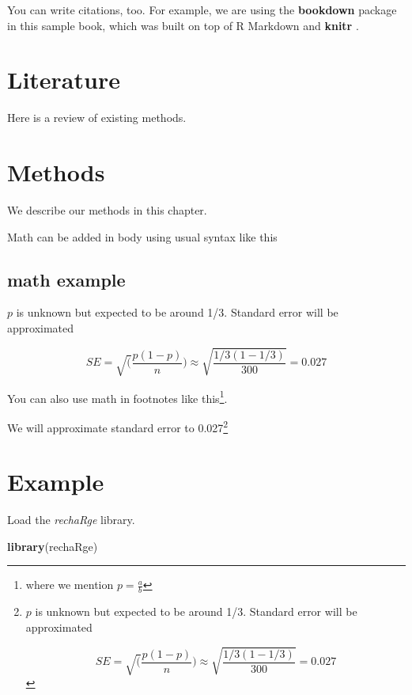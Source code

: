 \documentclass[
]{book}
\newenvironment{Shaded}{\begin{snugshade}}{\end{snugshade}}
\newcommand{\FunctionTok}[1]{\textcolor[rgb]{0.13,0.29,0.53}{\textbf{#1}}}
\newcommand{\NormalTok}[1]{#1}
\begin{document}
You can write citations, too. For example, we are using the \textbf{bookdown} package \citep{R-bookdown} in this sample book, which was built on top of R Markdown and \textbf{knitr} \citep{xie2015}.

\hypertarget{literature}{%
\chapter{Literature}\label{literature}}

Here is a review of existing methods.

\hypertarget{methods}{%
\chapter{Methods}\label{methods}}

We describe our methods in this chapter.

Math can be added in body using usual syntax like this

\hypertarget{math-example}{%
\section{math example}\label{math-example}}

\(p\) is unknown but expected to be around 1/3. Standard error will be approximated

\[
SE = \sqrt(\frac{p(1-p)}{n}) \approx \sqrt{\frac{1/3 (1 - 1/3)} {300}} = 0.027
\]

You can also use math in footnotes like this\footnote{where we mention \(p = \frac{a}{b}\)}.

We will approximate standard error to 0.027\footnote{\(p\) is unknown but expected to be around 1/3. Standard error will be approximated

  \[
  SE = \sqrt(\frac{p(1-p)}{n}) \approx \sqrt{\frac{1/3 (1 - 1/3)} {300}} = 0.027
  \]}

\hypertarget{example}{%
\chapter{Example}\label{example}}

Load the \emph{rechaRge} library.

\begin{Shaded}
\begin{Highlighting}[]
\FunctionTok{library}\NormalTok{(rechaRge)}
\end{Highlighting}
\end{Shaded}
\end{document}
